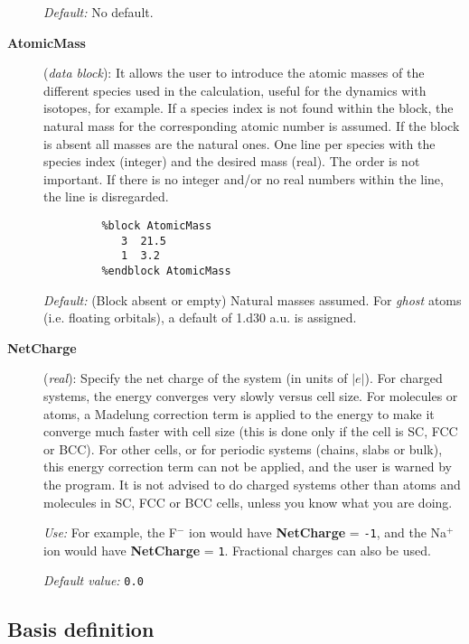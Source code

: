 \documentclass[11pt]{article}
\begin{document}
\begin{description}
{\it Default:} No default. 



\item[{\bf AtomicMass}] ({\it data block}): 
It allows the user to introduce
the atomic masses of the different species used in the calculation, useful
for the dynamics with isotopes, for example. If
a species index is not found within the block, the natural mass for the 
corresponding atomic number is assumed. If the block is absent all masses
are the natural ones. One line per species with the species index (integer)
and the desired mass (real). The order is not important. If there is no 
integer and/or no real numbers within the line, the line is disregarded.

\begin{verbatim}
         %block AtomicMass
            3  21.5
            1  3.2 
         %endblock AtomicMass
\end{verbatim}

{\it Default:} (Block absent or empty) Natural masses assumed. For 
{\it ghost} atoms (i.e. floating orbitals), a default of 1.d30 a.u. is 
assigned.


\item[{\bf NetCharge}] ({\it real}): 
Specify the net charge of the system (in units of $|e|$). 
For charged systems, the energy converges very slowly
versus cell size. For molecules or atoms, a Madelung
correction term is applied to the energy to make it converge
much faster with cell size (this is done only if
the cell is SC, FCC or BCC). For other cells, or for 
periodic systems (chains, slabs or bulk), this energy
correction term can not be applied, and the user is warned
by the program.   It is not advised to do charged systems
other than atoms and molecules in SC, FCC or BCC cells,
unless you know what you are doing.

{\it Use:} 
For example, the F$^-$ ion would have {\bf NetCharge} = {\tt -1},
and the Na$^+$ ion would have {\bf NetCharge} = {\tt 1}.
Fractional charges can also be used.

{\it Default value:} {\tt 0.0} 


\end{description}


\vspace{5pt}
\subsection{Basis definition}
\end{document}
